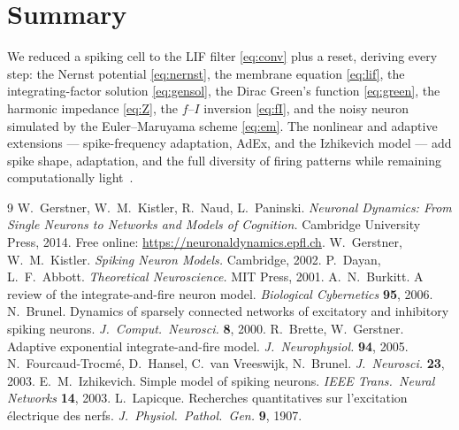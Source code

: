 \documentclass[11pt]{article}
\begin{document}
\section{Summary}
We reduced a spiking cell to the LIF filter \eqref{eq:conv} plus a reset, deriving every step:
the Nernst potential \eqref{eq:nernst}, the membrane equation \eqref{eq:lif}, the integrating-factor
solution \eqref{eq:gensol}, the Dirac Green's function \eqref{eq:green}, the harmonic impedance
\eqref{eq:Z}, the $f$--$I$ inversion \eqref{eq:fI}, and the noisy neuron simulated by the
Euler--Maruyama scheme \eqref{eq:em}. The nonlinear and adaptive extensions --- spike-frequency
adaptation, AdEx, and the Izhikevich model --- add spike shape, adaptation, and the full diversity
of firing patterns while remaining computationally light~\cite{gerstner2014,izhikevich2003}.

\begin{thebibliography}{9}
 W.~Gerstner, W.~M.~Kistler, R.~Naud, L.~Paninski.
  \emph{Neuronal Dynamics: From Single Neurons to Networks and Models of Cognition.}
  Cambridge University Press, 2014. Free online: \url{https://neuronaldynamics.epfl.ch}.
 W.~Gerstner, W.~M.~Kistler. \emph{Spiking Neuron Models.} Cambridge, 2002.
 P.~Dayan, L.~F.~Abbott. \emph{Theoretical Neuroscience.} MIT Press, 2001.
 A.~N.~Burkitt. A review of the integrate-and-fire neuron model.
  \emph{Biological Cybernetics} \textbf{95}, 2006.
 N.~Brunel. Dynamics of sparsely connected networks of excitatory and
  inhibitory spiking neurons. \emph{J.\ Comput.\ Neurosci.} \textbf{8}, 2000.
 R.~Brette, W.~Gerstner. Adaptive exponential integrate-and-fire model.
  \emph{J.\ Neurophysiol.} \textbf{94}, 2005.
 N.~Fourcaud-Trocm\'e, D.~Hansel, C.~van Vreeswijk, N.~Brunel.
  \emph{J.\ Neurosci.} \textbf{23}, 2003.
 E.~M.~Izhikevich. Simple model of spiking neurons.
  \emph{IEEE Trans.\ Neural Networks} \textbf{14}, 2003.
 L.~Lapicque. Recherches quantitatives sur l'excitation \'electrique des
  nerfs. \emph{J.\ Physiol.\ Pathol.\ Gen.} \textbf{9}, 1907.
\end{thebibliography}
\end{document}
